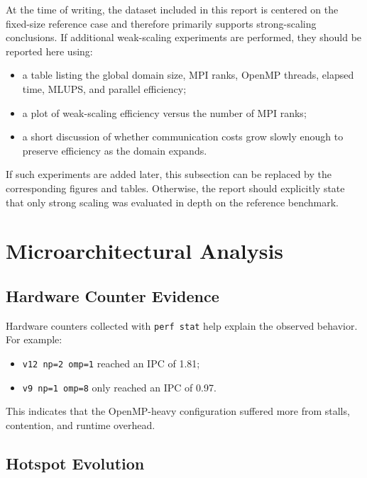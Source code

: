 \documentclass[11pt,a4paper]{article}
\begin{document}
At the time of writing, the dataset included in this report is centered on the fixed-size reference case and therefore primarily supports strong-scaling conclusions. If additional weak-scaling experiments are performed, they should be reported here using:
\begin{itemize}[leftmargin=1.5em]
  \item a table listing the global domain size, MPI ranks, OpenMP threads, elapsed time, MLUPS, and parallel efficiency;
  \item a plot of weak-scaling efficiency versus the number of MPI ranks;
  \item a short discussion of whether communication costs grow slowly enough to preserve efficiency as the domain expands.
\end{itemize}

If such experiments are added later, this subsection can be replaced by the corresponding figures and tables. Otherwise, the report should explicitly state that only strong scaling was evaluated in depth on the reference benchmark.

\section{Microarchitectural Analysis}

\subsection{Hardware Counter Evidence}

Hardware counters collected with \texttt{perf stat} help explain the observed behavior. For example:
\begin{itemize}[leftmargin=1.5em]
  \item \texttt{v12 np=2 omp=1} reached an IPC of 1.81;
  \item \texttt{v9 np=1 omp=8} only reached an IPC of 0.97.
\end{itemize}

This indicates that the OpenMP-heavy configuration suffered more from stalls, contention, and runtime overhead.

\begin{table}[H]
  \centering
  \caption{Example hardware-counter comparison.}
  \label{tab:perf-stat-comparison}
  
\end{table}

\subsection{Hotspot Evolution}
\end{document}
